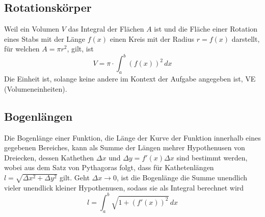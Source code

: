 \documentclass{article}
\begin{document}
\subsection{Rotationskörper}
Weil ein Volumen $V$ das Integral der Flächen $A$ ist und die Fläche einer Rotation eines Stabs mit der Länge $f(x)$ einen Kreis mit der Radius $r=f(x)$ darstellt, für welchen $A=\pi r^2$, gilt, ist
\[V = \pi \cdot \int_a^b (f(x))^2 \, dx\]
Die Einheit ist, solange keine andere im Kontext der Aufgabe angegeben ist, VE (Volumeneinheiten). 
  
\subsection{Bogenlängen}
Die Bogenlänge einer Funktion, die Länge der Kurve der Funktion innerhalb eines gegebenen Bereiches, kann als Summe der Längen mehrer Hypothenusen von Dreiecken, dessen Kathethen $\Delta x$ und $\Delta y = f'(x) \Delta x$ sind bestimmt werden, wobei aus dem Satz von Pythagoras folgt, dass für Kathetenlängen $l = \sqrt{\Delta x^2 + \Delta y^2}$ gilt.
Geht $\Delta x \to 0$, ist die Bogenlänge die Summe unendlich vieler unendlick kleiner Hypothenusen, sodass sie als Integral berechnet wird
\[l = \int_a^b \sqrt{1+(f'(x))^2} \, dx\]   
 
\end{document}
